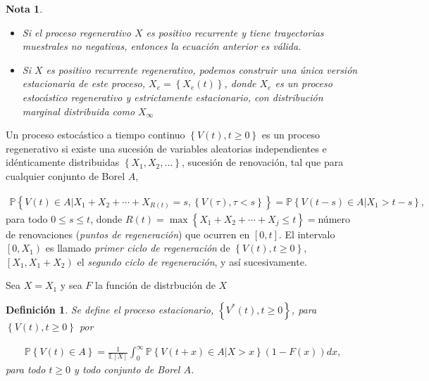 \documentclass{article}
\newtheorem{Def}{Definición}
\newtheorem{Note}{Nota}
\newcommand{\esp}{\mathbb{E}}
\newcommand{\prob}{\mathbb{P}}
\begin{document}
\begin{Note}
\begin{itemize}
\item[a)] Si el proceso regenerativo $X$ es positivo recurrente y tiene trayectorias muestrales no negativas, entonces la ecuaci\'on anterior es v\'alida.
\item[b)] Si $X$ es positivo recurrente regenerativo, podemos construir una \'unica versi\'on estacionaria de este proceso, $X_{e}=\left\{X_{e}\left(t\right)\right\}$, donde $X_{e}$ es un proceso estoc\'astico regenerativo y estrictamente estacionario, con distribuci\'on marginal distribuida como $X_{\infty}$
\end{itemize}
\end{Note}



Un proceso estoc\'astico a tiempo continuo $\left\{V\left(t\right),t\geq0\right\}$ es un proceso regenerativo si existe una sucesi\'on de variables aleatorias independientes e id\'enticamente distribuidas $\left\{X_{1},X_{2},\ldots\right\}$, sucesi\'on de renovaci\'on, tal que para cualquier conjunto de Borel $A$, 

\begin{eqnarray*}
\prob\left\{V\left(t\right)\in A|X_{1}+X_{2}+\cdots+X_{R\left(t\right)}=s,\left\{V\left(\tau\right),\tau<s\right\}\right\}=\prob\left\{V\left(t-s\right)\in A|X_{1}>t-s\right\},
\end{eqnarray*}
para todo $0\leq s\leq t$, donde $R\left(t\right)=\max\left\{X_{1}+X_{2}+\cdots+X_{j}\leq t\right\}=$n\'umero de renovaciones ({\emph{puntos de regeneraci\'on}}) que ocurren en $\left[0,t\right]$. El intervalo $\left[0,X_{1}\right)$ es llamado {\emph{primer ciclo de regeneraci\'on}} de $\left\{V\left(t \right),t\geq0\right\}$, $\left[X_{1},X_{1}+X_{2}\right)$ el {\emph{segundo ciclo de regeneraci\'on}}, y as\'i sucesivamente.

Sea $X=X_{1}$ y sea $F$ la funci\'on de distrbuci\'on de $X$


\begin{Def}
Se define el proceso estacionario, $\left\{V^{*}\left(t\right),t\geq0\right\}$, para $\left\{V\left(t\right),t\geq0\right\}$ por

\begin{eqnarray*}
\prob\left\{V\left(t\right)\in A\right\}=\frac{1}{\esp\left[X\right]}\int_{0}^{\infty}\prob\left\{V\left(t+x\right)\in A|X>x\right\}\left(1-F\left(x\right)\right)dx,
\end{eqnarray*} 
para todo $t\geq0$ y todo conjunto de Borel $A$.
\end{Def}
\end{document}
